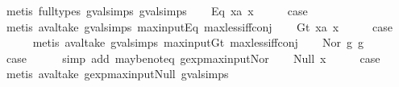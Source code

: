 \begin{isabellebody}
\ {\isacharparenleft}metis\ {\isacharparenleft}full{\isacharunderscore}types{\isacharparenright}\ gval{\isachardot}simps{\isacharparenleft}{}{\isacharparenright}\ gval{\isachardot}simps{\isacharparenleft}{}{\isacharparenright}{\isacharparenright}\isanewline
{}\isamarkupfalse%
\isanewline
\ \ \isamarkupfalse%
\ {\isacharparenleft}Eq\ x{}a\ x{}{\isacharparenright}\isanewline
\ \ \isamarkupfalse%
\ \isamarkupfalse%
\ {\isacharquery}case\isanewline
\ \ \ \ \isamarkupfalse%
\ {\isacharparenleft}metis\ aval{\isacharunderscore}take\ gval{\isachardot}simps{\isacharparenleft}{}{\isacharparenright}\ max{\isacharunderscore}input{\isacharunderscore}Eq\ max{\isacharunderscore}less{\isacharunderscore}iff{\isacharunderscore}conj{\isacharparenright}\isanewline
{}\isamarkupfalse%
\isanewline
\ \ \isamarkupfalse%
\ {\isacharparenleft}Gt\ x{}a\ x{}{\isacharparenright}\isanewline
\ \ \isamarkupfalse%
\ \isamarkupfalse%
\ {\isacharquery}case\isanewline
\ \ \ \ \isamarkupfalse%
\ {\isacharparenleft}metis\ aval{\isacharunderscore}take\ gval{\isachardot}simps{\isacharparenleft}{}{\isacharparenright}\ max{\isacharunderscore}input{\isacharunderscore}Gt\ max{\isacharunderscore}less{\isacharunderscore}iff{\isacharunderscore}conj{\isacharparenright}\isanewline
{}\isamarkupfalse%
\isanewline
\ \ \isamarkupfalse%
\ {\isacharparenleft}Nor\ g{}\ g{}{\isacharparenright}\isanewline
\ \ \isamarkupfalse%
\ \isamarkupfalse%
\ {\isacharquery}case\isanewline
\ \ \ \ \isamarkupfalse%
\ {\isacharparenleft}simp\ add{\isacharcolon}\ maybe{\isacharunderscore}not{\isacharunderscore}eq\ gexp{\isacharunderscore}max{\isacharunderscore}input{\isacharunderscore}Nor{\isacharparenright}\isanewline
{}\isamarkupfalse%
\isanewline
\ \ \isamarkupfalse%
\ {\isacharparenleft}Null\ x{\isacharparenright}\isanewline
\ \ \isamarkupfalse%
\ \isamarkupfalse%
\ {\isacharquery}case\isanewline
\ \ \ \ \isamarkupfalse%
\ {\isacharparenleft}metis\ aval{\isacharunderscore}take\ gexp{\isacharunderscore}max{\isacharunderscore}input{\isacharunderscore}Null\ gval{\isachardot}simps{\isacharparenleft}{}{\isacharparenright}{\isacharparenright}\isanewline
{}\isamarkupfalse%

\end{isabellebody}
